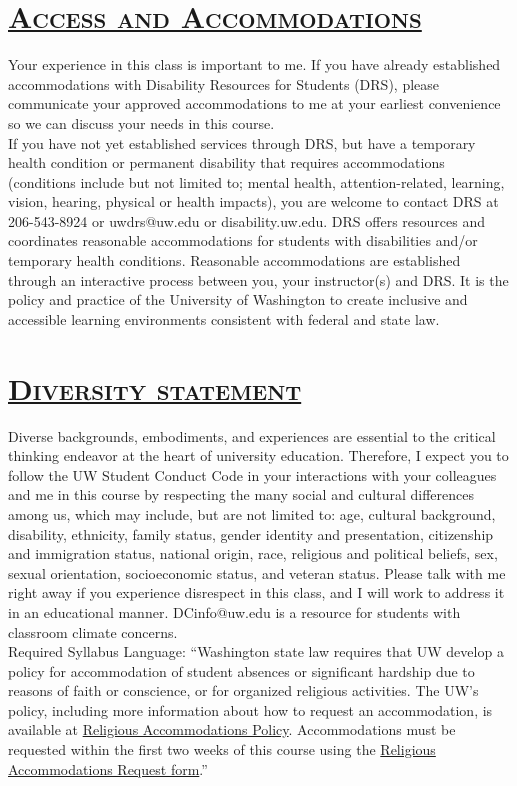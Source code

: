 \documentclass[fancyhdr,10pt]{article}
\begin{document}
\section*{\underline{\textsc{Access and Accommodations}}}
Your experience in this class is important to me. If you have already established accommodations with Disability Resources for Students (DRS), please communicate your approved accommodations to me at your earliest convenience so we can discuss your needs in this course.\\

If you have not yet established services through DRS, but have a temporary health condition or permanent disability that requires accommodations (conditions include but not limited to; mental health, attention-related, learning, vision, hearing, physical or health impacts), you are welcome to contact DRS at 206-543-8924 or uwdrs@uw.edu or disability.uw.edu. DRS offers resources and coordinates reasonable accommodations for students with disabilities and/or temporary health conditions.  Reasonable accommodations are established through an interactive process between you, your instructor(s) and DRS.  It is the policy and practice of the University of Washington to create inclusive and accessible learning environments consistent with federal and state law.


\section*{\underline{\textsc{Diversity statement}}}
Diverse backgrounds, embodiments, and experiences are essential to the critical thinking endeavor at the heart of university education. Therefore, I expect you to follow the UW Student Conduct Code in your interactions with your colleagues and me in this course by respecting the many social and cultural differences among us, which may include, but are not limited to: age, cultural background, disability, ethnicity, family status, gender identity and presentation, citizenship and immigration status, national origin, race, religious and political beliefs, sex, sexual orientation, socioeconomic status, and veteran status. Please talk with me right away if you experience disrespect in this class, and I will work to address it in an educational manner. DCinfo@uw.edu is a resource for students with classroom climate concerns.\\

Required Syllabus Language: ``Washington state law requires that UW develop a policy for accommodation of student absences or significant hardship due to reasons of faith or conscience, or for organized religious activities. The UW's policy, including more information about how to request an accommodation, is available at \href{https://registrar.washington.edu/staffandfaculty/religious-accommodations-policy/}{Religious Accommodations Policy}. Accommodations must be requested within the first two weeks of this course using the \href{https://registrar.washington.edu/students/religious-accommodations-request/}{Religious Accommodations Request form}.''
\end{document}
